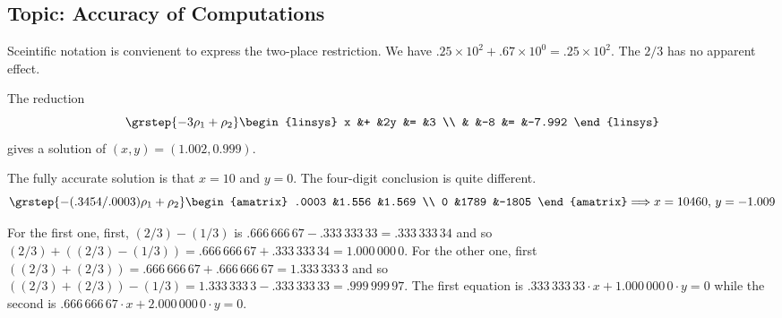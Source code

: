 \subsection{Topic: Accuracy of Computations}
\begin{ans}{1}
      Sceintific notation is convienent to express the two-place restriction.
      We have $.25\times 10^{2}+.67\times 10^{0}=.25\times 10^{2}$.
      The $2/3$ has no apparent effect.
    
\end{ans}
\begin{ans}{2}
      The reduction
      \begin{equation*}
        \grstep{-3\rho_1+\rho_2}
        \begin{linsys}{2}
          x  &+  &2y  &=  &3  \\
             &   &-8  &=  &-7.992
        \end{linsys}
      \end{equation*}
      gives a solution of \( (x,y)=(1.002,0.999) \).
    
\end{ans}
\begin{ans}{3}
      \begin{exparts}
        \partsitem The fully accurate solution is that $x=10$ and $y=0$.
        \partsitem The four-digit conclusion is quite different.
          \begin{equation*}
            \grstep{-(.3454/.0003)\rho_1+\rho_2}
            \begin{amatrix}{2}
              .0003  &1.556  &1.569  \\
              0      &1789   &-1805
            \end{amatrix}
            \Longrightarrow
            x=10460,\,y=-1.009
          \end{equation*}
      \end{exparts}
    
\end{ans}
\begin{ans}{4}
      \begin{exparts}
        \partsitem For the first one, first, $(2/3)-(1/3)$ is
          $.666\,666\,67-.333\,333\,33=.333\,333\,34$
          and so
          $(2/3)+((2/3)-(1/3))=.666\,666\,67+.333\,333\,34=1.000\,000\,0$.
          For the other one, first
          $((2/3)+(2/3))=.666\,666\,67+.666\,666\,67=1.333\,333\,3$
          and so
          $((2/3)+(2/3))-(1/3)=1.333\,333\,3-.333\,333\,33=.999\,999\,97$.
        \partsitem The first equation is
          $.333\,333\,33\cdot x+1.000\,000\,0\cdot y=0$
          while the second is
          $.666\,666\,67\cdot x+2.000\,000\,0\cdot y=0$.
      \end{exparts}
    
\end{ans}
